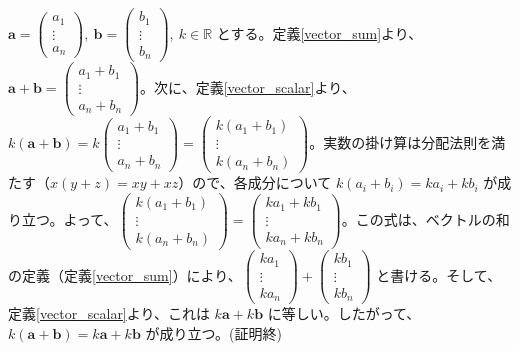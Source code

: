 \begin{thm}[スカラー倍の性質]
\begin{proof*}
$\bm{a} = \begin{pmatrix} a_1 \\ \vdots \\ a_n \end{pmatrix},\ \bm{b} = \begin{pmatrix} b_1 \\ \vdots \\ b_n \end{pmatrix},\ k\in\mathbb{R}$ とする。定義\ref{vector_sum}より、$\bm{a} + \bm{b} = \begin{pmatrix} a_1 + b_1 \\ \vdots \\ a_n + b_n \end{pmatrix}$。次に、定義\ref{vector_scalar}より、$k(\bm{a} + \bm{b}) = k \begin{pmatrix} a_1 + b_1 \\ \vdots \\ a_n + b_n \end{pmatrix} = \begin{pmatrix} k(a_1 + b_1) \\ \vdots \\ k(a_n + b_n) \end{pmatrix}$。実数の掛け算は分配法則を満たす（$x(y+z) = xy+xz$）ので、各成分について $k(a_i + b_i) = k a_i + k b_i$ が成り立つ。よって、$\begin{pmatrix} k(a_1 + b_1) \\ \vdots \\ k(a_n + b_n) \end{pmatrix} = \begin{pmatrix} k a_1 + k b_1 \\ \vdots \\ k a_n + k b_n \end{pmatrix}$。この式は、ベクトルの和の定義（定義\ref{vector_sum}）により、$\begin{pmatrix} k a_1 \\ \vdots \\ k a_n \end{pmatrix} + \begin{pmatrix} k b_1 \\ \vdots \\ k b_n \end{pmatrix}$ と書ける。そして、定義\ref{vector_scalar}より、これは $k\bm{a} + k\bm{b}$ に等しい。したがって、$k(\bm{a}+\bm{b}) = k\bm{a} + k\bm{b}$ が成り立つ。(証明終)
\end{proof*}
\end{thm}

